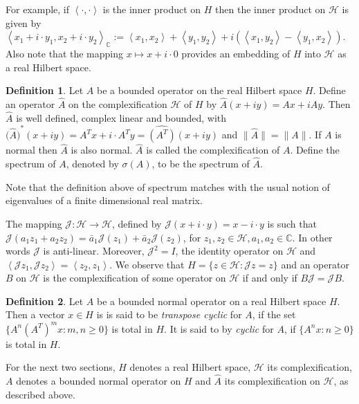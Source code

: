\documentclass[12pt,a4paper,twoside]{article}
\numberwithin{equation}{section}
\theoremstyle{definition}  %
\newtheorem{defn}{Definition}[section]
\theoremstyle{plain}  %
\theoremstyle{remark} %
\begin{document}
For example, if $\left\langle \cdot,\cdot \right\rangle$ is the inner product on $H$ then the inner product on $\mathcal{H}$ is given by
 $\left\langle x_{1} + i\cdot y_{1}, x_{2} + i \cdot y_{2} \right\rangle_{\mathbb{C}} := \left\langle x_{1} ,x_{2} \right\rangle + \left\langle y_{1},y_{2} \right\rangle + i \left( \left\langle x_{1},y_{2} \right\rangle - \left\langle y_{1},x_{2} \right\rangle \right)$. Also note that the mapping $x \mapsto x+i \cdot0$ provides an embedding of $H$ into $\mathcal{H}$ as a real Hilbert space.


\begin{defn}\label{def:spectrum}
  Let $A$ be a bounded operator on the real Hilbert space $H$. Define an operator $\hat{A}$ on the complexification $\mathcal{H}$ of
  $H$ by $\hat{A} (x+iy) = Ax +iAy$. Then $\hat{A}$ is well defined, complex linear and bounded, with $({\hat{A})}^* (x+iy) = A^Tx +i\cdot A^Ty = \widehat{(A^T)}(x+iy)$ and $\|\hat{A}\| = \|A\|$. If $A$ is normal then $\hat{A}$ is also normal. $\hat{A}$ is called the complexification of $A$.
Define the spectrum of $A$, denoted by $\sigma(A)$, to be the
spectrum of $\hat{A}.$
\end{defn}
Note that the  definition above of spectrum matches with  the usual
notion of eigenvalues of a finite dimensional real matrix.

 The mapping $\mathcal{J} \colon \mathcal{H} \to \mathcal{H}$, defined by $\mathcal{J}(x + i\cdot y)= x-i\cdot y$  is such that $\mathcal{J} (a_{1}z_{1}+a_{2}z_{2})= \bar{a}_{1}\mathcal{J}(z_{1})+\bar{a}_{2}\mathcal{J}(z_{2})$, for $z_{1},z_{2} \in \mathcal{H}, a_{1}, a_{2} \in \mathbb{C}.$ In other words $\mathcal J$ is anti-linear. Moreover, $\mathcal{J}^{2}= I$, the identity operator on $\mathcal{H}$ and $\left\langle \mathcal{J}z_{1},\mathcal{J}z_{2} \right\rangle= \left\langle z_{2},z_{1} \right\rangle$. We observe that  $H = \{z \in \mathcal{H} \colon \mathcal{J}z = z\}$ and an operator $B$ on $\mathcal{H}$ is the complexification of some operator on $\mathcal H$ if and only if $B\mathcal{J}=\mathcal{J}B$.



\begin{defn}\label{def:cyclic-vec}
   Let $A$ be a bounded normal operator on a real Hilbert space $H$. Then a vector $x\in H$ is is said to be  {\em transpose cyclic\/} for $A$, if
the  set $\{ A^n(A^T)^mx: m, n\geq 0\}$ is total in $H.$
It is said to by {\em cyclic\/} for $A$,  if $\{ A^nx: n\geq 0\}$ is total
in $H.$
\end{defn}
For the next two sections, $H$ denotes a real Hilbert space, $\mathcal{H}$ its complexification, $A$ denotes a bounded normal operator on $H$ and $\hat{A}$ its complexification on $\mathcal{H}$,
as described above.
\end{document}
